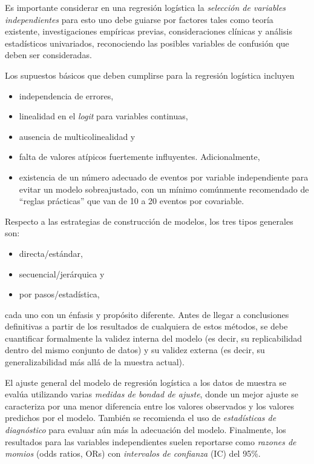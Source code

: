 \documentclass[12pt]{article}
\begin{document}
Es importante considerar en una regresi\'on log\'istica la \textit{selecci\'on de variables independientes} para esto uno debe guiarse por factores tales como teor\'ia existente, investigaciones emp\'iricas previas, consideraciones cl\'inicas y an\'alisis estad\'isticos univariados, reconociendo las posibles variables de confusi\'on que deben ser consideradas. 

Los supuestos b\'asicos que deben cumplirse para la regresi\'on log\'istica incluyen
\begin{itemize}
\item independencia de errores, 
\item linealidad en el \textit{logit} para variables continuas, 
\item ausencia de multicolinealidad y 
\item falta de valores at\'ipicos fuertemente influyentes. Adicionalmente, 
\item existencia de un n\'umero adecuado de eventos por variable independiente para evitar un modelo sobreajustado, con un m\'inimo com\'unmente recomendado de “reglas pr\'acticas” que van de 10 a 20 eventos por covariable.
\end{itemize}

Respecto a las estrategias de construcci\'on de modelos, los tres tipos generales son: 
\begin{itemize}
\item directa/est\'andar, 
\item secuencial/jer\'arquica y 
\item por pasos/estad\'istica,
\end{itemize}
cada uno con un \'enfasis y prop\'osito diferente. Antes de llegar a conclusiones definitivas a partir de los resultados de cualquiera de estos m\'etodos, se debe cuantificar formalmente la validez interna del modelo (es decir, su replicabilidad dentro del mismo conjunto de datos) y su validez externa (es decir, su generalizabilidad m\'as all\'a de la muestra actual).

El ajuste general del modelo de regresi\'on log\'istica a los datos de muestra se eval\'ua utilizando varias \textit{medidas de bondad de ajuste}, donde un mejor ajuste se caracteriza por una menor diferencia entre los valores observados y los valores predichos por el modelo. Tambi\'en se recomienda el uso de \textit{estad\'isticas de diagn\'ostico} para evaluar a\'un m\'as la adecuaci\'on del modelo. Finalmente, los resultados para las variables independientes suelen reportarse como \textit{razones de momios} (odds ratios, ORs) con \textit{intervalos de confianza} (IC) del 95\%.
\end{document}
